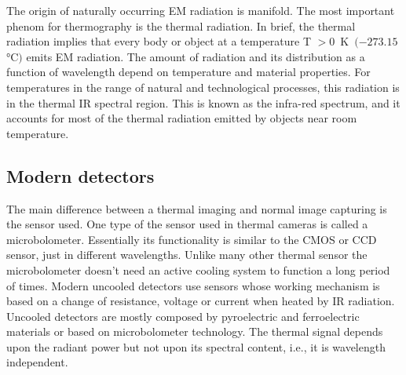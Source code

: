% 
The origin of naturally occurring EM radiation is manifold. 
The most important phenom for thermography is the thermal radiation. 
In brief, the thermal radiation implies that every body or object at a
temperature T $>0 \,$ \si{\kelvin} $\,(-273.15 \,$\si{\celsius}$)$ emits EM
radiation. 
The amount of radiation and its distribution as a function of wavelength depend
on temperature and material properties. \cite{vollmer2017infrared} 
For temperatures in the range of natural and technological processes, this 
radiation is in the thermal IR spectral region. 
This is known as the infra-red spectrum, and it accounts for most of the
thermal radiation emitted by objects near room temperature.
%
\subsection{Modern detectors}
\label{ssec:modern-detect}
The main difference between a thermal imaging and normal image capturing is the
sensor used. One type of the sensor used in thermal cameras is called a
microbolometer. Essentially its functionality is similar to the CMOS or CCD
sensor, just in different wavelengths. Unlike many other thermal sensor the
microbolometer doesn't need an active cooling system to function a long period
of times. Modern uncooled detectors use sensors whose working mechanism is based
on a change of resistance, voltage or current when heated by IR radiation.
Uncooled detectors are mostly composed by pyroelectric and ferroelectric
materials or based on microbolometer technology. The thermal signal depends upon
the radiant power but not upon its spectral content, i.e., it is wavelength
independent.\cite{10.1117/12.2266142,rogalski2000infrared}

